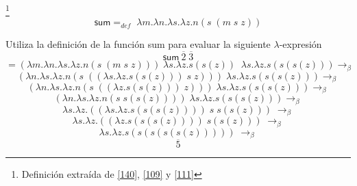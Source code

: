         \begin{definition}\footnote{Definición extraída de \hyperlink{140}{[140]}, \hyperlink{109}{[109]} y  \hyperlink{111}{[111]}}
            $$\textsf{sum} =_{def}  \; \lambda m.\lambda n.\lambda s.\lambda z.n(s \; (m \; s \; z))$$
        \end{definition}

        \begin{exercise}
            Utiliza la definición de la función \textsf{sum} para evaluar la siguiente  $\lambda$-expresión
            \[
                \textsf{sum}\  \overline{2} \; \overline{3} 
            \]
            \[
                = (\lambda m.\lambda n.\lambda s.\lambda z.n(s \; (m\; s \; z))) \; \lambda s.\lambda z.s(s(z)) \;\; \lambda s.\lambda z.s(s(s(z))) \rightarrow_\beta 
            \]
           \[
                (\lambda n.\lambda s.\lambda z.n(s \; ((\lambda s.\lambda z.s(s(z)))\; s \; z))) \; \lambda s.\lambda z.s(s(s(z))) \rightarrow_\beta 
            \]
           \[
                (\lambda n.\lambda s.\lambda z.n(s \; ((\lambda z.s(s(z))) \; z))) \; \lambda s.\lambda z.s(s(s(z))) \rightarrow_\beta 
            \]
           \[
                (\lambda n.\lambda s.\lambda z.n (s \; s(s(z)))) \; \lambda s.\lambda z.s(s(s(z))) \rightarrow_\beta 
            \]
           \[
                \lambda s.\lambda z.((\lambda s.\lambda z.s(s(s(z))))\; s \; s(s(z))) \; \rightarrow_\beta 
            \]
           \[
                \lambda s.\lambda z.((\lambda z.s(s(s(z)))) \; s(s(z))) \; \rightarrow_\beta 
            \]
           \[
                \lambda s.\lambda z.s(s(s(s(s(z))))) \; \rightarrow_\beta 
            \]
		\[
			\overline{5}
		\]
         
        \end{exercise}

